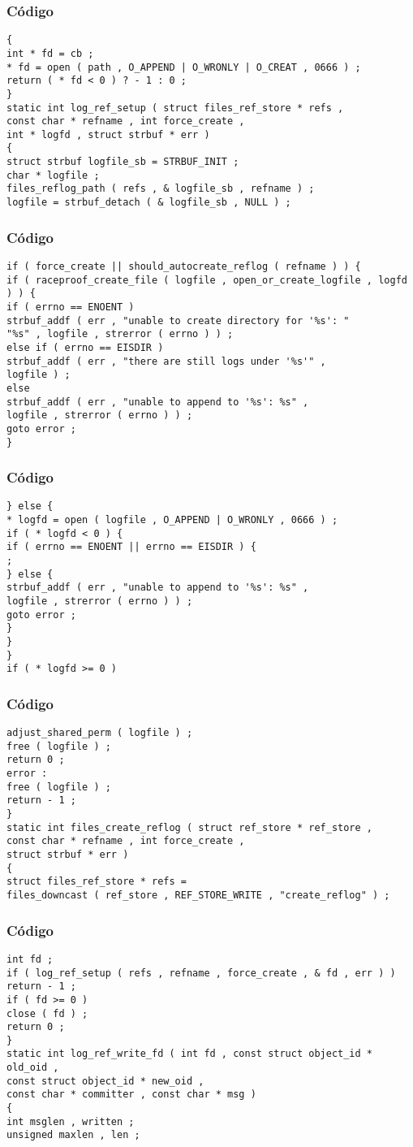 \documentclass{beamer}
\begin{document}
\begin{frame}[fragile]
\frametitle{C\'odigo}
\begin{verbatim}
{ 
int * fd = cb ; 
* fd = open ( path , O_APPEND | O_WRONLY | O_CREAT , 0666 ) ; 
return ( * fd < 0 ) ? - 1 : 0 ; 
} 
static int log_ref_setup ( struct files_ref_store * refs , 
const char * refname , int force_create , 
int * logfd , struct strbuf * err ) 
{ 
struct strbuf logfile_sb = STRBUF_INIT ; 
char * logfile ; 
files_reflog_path ( refs , & logfile_sb , refname ) ; 
logfile = strbuf_detach ( & logfile_sb , NULL ) ; 
\end{verbatim}
\end{frame}
\begin{frame}[fragile]
\frametitle{C\'odigo}
\begin{verbatim}
if ( force_create || should_autocreate_reflog ( refname ) ) { 
if ( raceproof_create_file ( logfile , open_or_create_logfile , logfd ) ) { 
if ( errno == ENOENT ) 
strbuf_addf ( err , "unable to create directory for '%s': " 
"%s" , logfile , strerror ( errno ) ) ; 
else if ( errno == EISDIR ) 
strbuf_addf ( err , "there are still logs under '%s'" , 
logfile ) ; 
else 
strbuf_addf ( err , "unable to append to '%s': %s" , 
logfile , strerror ( errno ) ) ; 
goto error ; 
} 
\end{verbatim}
\end{frame}
\begin{frame}[fragile]
\frametitle{C\'odigo}
\begin{verbatim}
} else { 
* logfd = open ( logfile , O_APPEND | O_WRONLY , 0666 ) ; 
if ( * logfd < 0 ) { 
if ( errno == ENOENT || errno == EISDIR ) { 
; 
} else { 
strbuf_addf ( err , "unable to append to '%s': %s" , 
logfile , strerror ( errno ) ) ; 
goto error ; 
} 
} 
} 
if ( * logfd >= 0 ) 
\end{verbatim}
\end{frame}
\begin{frame}[fragile]
\frametitle{C\'odigo}
\begin{verbatim}
adjust_shared_perm ( logfile ) ; 
free ( logfile ) ; 
return 0 ; 
error : 
free ( logfile ) ; 
return - 1 ; 
} 
static int files_create_reflog ( struct ref_store * ref_store , 
const char * refname , int force_create , 
struct strbuf * err ) 
{ 
struct files_ref_store * refs = 
files_downcast ( ref_store , REF_STORE_WRITE , "create_reflog" ) ; 
\end{verbatim}
\end{frame}
\begin{frame}[fragile]
\frametitle{C\'odigo}
\begin{verbatim}
int fd ; 
if ( log_ref_setup ( refs , refname , force_create , & fd , err ) ) 
return - 1 ; 
if ( fd >= 0 ) 
close ( fd ) ; 
return 0 ; 
} 
static int log_ref_write_fd ( int fd , const struct object_id * old_oid , 
const struct object_id * new_oid , 
const char * committer , const char * msg ) 
{ 
int msglen , written ; 
unsigned maxlen , len ; 
\end{verbatim}
\end{frame}
\end{document}

